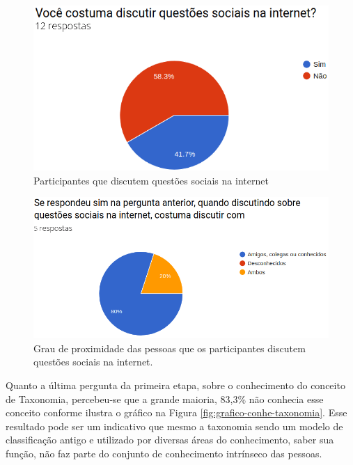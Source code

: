 \begin{figure}[!ht]
    \centering
    \includegraphics[scale=0.4]{./figuras/discutir.png}
    \caption{Participantes que discutem questões sociais na internet}
    \label{fig:grafico-discu}
\end{figure}

\begin{figure}[!ht]
    \centering
    \includegraphics[scale=0.4]{./figuras/discutir_com.png}
    \caption{Grau de proximidade das pessoas que os participantes discutem questões sociais na internet.}
    \label{fig:grafico-discu-alvo}
\end{figure}

\par
Quanto a última pergunta da primeira etapa, sobre o conhecimento do conceito de Taxonomia, percebeu-se que a grande maioria, 83,3\% não conhecia esse conceito conforme ilustra 
o gráfico na Figura \ref{fig:grafico-conhe-taxonomia}. Esse resultado pode ser um indicativo que mesmo a taxonomia sendo um modelo de classificação antigo e utilizado por diversas 
áreas do conhecimento, saber sua função, não faz parte do conjunto de conhecimento intrínseco das pessoas.

